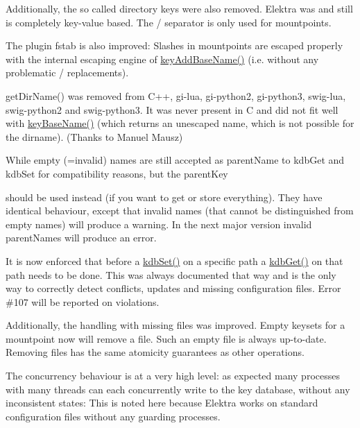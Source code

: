 Additionally, the so called directory keys were also removed. Elektra was and still is completely key-\/value based. The {\ttfamily /} separator is only used for mountpoints.

The plugin fstab is also improved\+: Slashes in mountpoints are escaped properly with the internal escaping engine of \mbox{\hyperlink{group__keyname_gaa942091fc4bd5c2699e49ddc50829524}{key\+Add\+Base\+Name()}} (i.\+e. without any problematic {\ttfamily /} replacements).

get\+Dir\+Name() was removed from C++, gi-\/lua, gi-\/python2, gi-\/python3, swig-\/lua, swig-\/python2 and swig-\/python3. It was never present in C and did not fit well with \mbox{\hyperlink{group__keyname_gaaff35e7ca8af5560c47e662ceb9465f5}{key\+Base\+Name()}} (which returns an unescaped name, which is not possible for the dirname). (Thanks to Manuel Mausz)

While empty (=invalid) names are still accepted as parent\+Name to {\ttfamily kdb\+Get} and {\ttfamily kdb\+Set} for compatibility reasons, but the parent\+Key


\begin{DoxyCode}{0}
\end{DoxyCode}


should be used instead (if you want to get or store everything). They have identical behaviour, except that invalid names (that cannot be distinguished from empty names) will produce a warning. In the next major version invalid parent\+Names will produce an error.

It is now enforced that before a \mbox{\hyperlink{group__kdb_ga11436b058408f83d303ca5e996832bcf}{kdb\+Set()}} on a specific path a \mbox{\hyperlink{group__kdb_ga28e385fd9cb7ccfe0b2f1ed2f62453a1}{kdb\+Get()}} on that path needs to be done. This was always documented that way and is the only way to correctly detect conflicts, updates and missing configuration files. Error \#107 will be reported on violations.

Additionally, the handling with missing files was improved. Empty keysets for a mountpoint now will remove a file. Such an empty file is always up-\/to-\/date. Removing files has the same atomicity guarantees as other operations.

The concurrency behaviour is at a very high level\+: as expected many processes with many threads can each concurrently write to the key database, without any inconsistent states\+: This is noted here because Elektra works on standard configuration files without any guarding processes.

